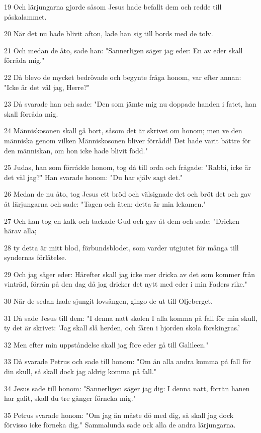 \par 19 Och lärjungarna gjorde såsom Jesus hade befallt dem och redde till påskalammet.
\par 20 När det nu hade blivit afton, lade han sig till bords med de tolv.
\par 21 Och medan de åto, sade han: "Sannerligen säger jag eder: En av eder skall förråda mig."
\par 22 Då blevo de mycket bedrövade och begynte fråga honom, var efter annan: "Icke är det väl jag, Herre?"
\par 23 Då svarade han och sade: "Den som jämte mig nu doppade handen i fatet, han skall förråda mig.
\par 24 Människosonen skall gå bort, såsom det är skrivet om honom; men ve den människa genom vilken Människosonen bliver förrådd! Det hade varit bättre för den människan, om hon icke hade blivit född."
\par 25 Judas, han som förrådde honom, tog då till orda och frågade: "Rabbi, icke är det väl jag?" Han svarade honom: "Du har själv sagt det."
\par 26 Medan de nu åto, tog Jesus ett bröd och välsignade det och bröt det och gav åt lärjungarna och sade: "Tagen och äten; detta är min lekamen."
\par 27 Och han tog en kalk och tackade Gud och gav åt dem och sade: "Dricken härav alla;
\par 28 ty detta är mitt blod, förbundsblodet, som varder utgjutet för många till syndernas förlåtelse.
\par 29 Och jag säger eder: Härefter skall jag icke mer dricka av det som kommer från vinträd, förrän på den dag då jag dricker det nytt med eder i min Faders rike."
\par 30 När de sedan hade sjungit lovsången, gingo de ut till Oljeberget.
\par 31 Då sade Jesus till dem: "I denna natt skolen I alla komma på fall för min skull, ty det är skrivet: 'Jag skall slå herden, och fåren i hjorden skola förskingras.'
\par 32 Men efter min uppståndelse skall jag före eder gå till Galileen."
\par 33 Då svarade Petrus och sade till honom: "Om än alla andra komma på fall för din skull, så skall dock jag aldrig komma på fall."
\par 34 Jesus sade till honom: "Sannerligen säger jag dig: I denna natt, förrän hanen har galit, skall du tre gånger förneka mig."
\par 35 Petrus svarade honom: "Om jag än måste dö med dig, så skall jag dock förvisso icke förneka dig." Sammalunda sade ock alla de andra lärjungarna.
